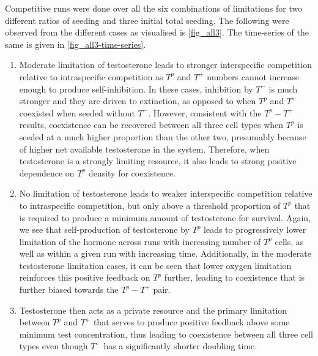 Competitive runs were done over all the six combinations of limitations for two different ratios of seeding and three initial total seeding. The following were observed from the different cases as visualised is \autoref{fig_all3}. The time-series of the same is given in \autoref{fig_all3-time-series}.
\begin{enumerate}
  \item Moderate limitation of testosterone leads to  stronger interspecific competition relative to intraspecific competition as $T^p$ and $T^+$ numbers cannot increase enough to produce self-inhibition. In these cases, inhibition by $T^-$ is much stronger and they are driven to extinction, as opposed to when $T^p$ and $T^+$ coexisted when seeded without $T^-$. However, consistent with the $T^p - T^+$ results, coexistence can be recovered between all three cell types when $T^p$ is seeded at a much higher proportion than the other two, presumably because of higher net available testosterone in the system. Therefore, when testosterone is a strongly limiting resource, it also leads to strong positive dependence on $T^p$ density for coexistence.
  \item No limitation of testosterone leads to weaker interspecific competition relative to intraspecific competition, but only above a threshold proportion of $T^p$ that is required to produce a minimum amount of testosterone for survival. Again, we see that self-production of testosterone by $T^p$ leads to progressively lower limitation of the hormone across runs with increasing number of $T^p$ cells, as well as within a given run with increasing time. Additionally, in the moderate testosterone limitation cases, it can be seen that lower oxygen limitation reinforces this positive feedback on $T^p$ further, leading to coexistence that is further biased towards the $T^p - T^+$ pair.
  \item Testosterone then acts as a private resource and the primary limitation between $T^p$ and $T^+$ that serves to produce positive feedback above some minimum test concentration, thus leading to coexistence between all three cell types even though $T^-$ has a significantly shorter doubling time.
\end{enumerate}
